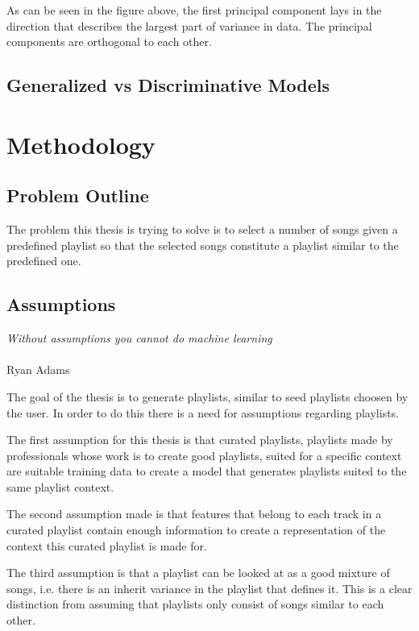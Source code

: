 \documentclass[a4paper,11pt]{kth-mag}
\begin{document}
As can be seen in the figure above, the first principal component lays in the direction that describes the largest part of variance in data. The principal components are orthogonal to each other. 

\section{Generalized vs Discriminative Models}

\chapter{Methodology}

\section{Problem Outline}
The problem this thesis is trying to solve is to select a number of songs given a predefined playlist so that the selected songs constitute a playlist similar to the predefined one. 

\section{Assumptions}
\begin{displayquote}
\textit{Without assumptions you cannot do machine learning} \\\\Ryan Adams
\end{displayquote}

The goal of the thesis is to generate playlists, similar to seed playlists choosen by the user. In order to do this there is a need for assumptions regarding playlists.

The first assumption for this thesis is that curated playlists, playlists made by professionals whose work is to create good playlists, suited for a specific context are suitable training data to create a model that generates playlists suited to the same playlist context.

The second assumption made is that features that belong to each track in a curated playlist contain enough information to create a representation of the context this curated playlist is made for.

The third assumption is that a playlist can be looked at as a good mixture of songs, i.e. there is an inherit variance in the playlist that defines it. This is a clear distinction from assuming that playlists only consist of songs similar to each other.
\end{document}
